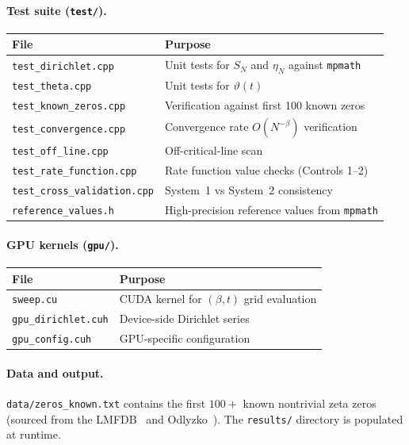 \paragraph{Test suite (\texttt{test/}).}

\begin{longtable}{@{}p{5cm}p{7.7cm}@{}}
\toprule
\textbf{File} & \textbf{Purpose} \\
\midrule
\endhead
\texttt{test\_dirichlet.cpp}        & Unit tests for $S_N$ and $\eta_N$ against \texttt{mpmath} \\
\texttt{test\_theta.cpp}            & Unit tests for $\vartheta(t)$ \\
\texttt{test\_known\_zeros.cpp}     & Verification against first 100 known zeros \\
\texttt{test\_convergence.cpp}      & Convergence rate $O(N^{-\beta})$ verification \\
\texttt{test\_off\_line.cpp}        & Off-critical-line scan \\
\texttt{test\_rate\_function.cpp}   & Rate function value checks (Controls 1--2) \\
\texttt{test\_cross\_validation.cpp}& System~1 vs System~2 consistency \\
\texttt{reference\_values.h}        & High-precision reference values from \texttt{mpmath} \\
\bottomrule
\end{longtable}

\paragraph{GPU kernels (\texttt{gpu/}).}

\begin{longtable}{@{}p{4.2cm}p{8.5cm}@{}}
\toprule
\textbf{File} & \textbf{Purpose} \\
\midrule
\endhead
\texttt{sweep.cu}           & CUDA kernel for $(\beta,t)$ grid evaluation \\
\texttt{gpu\_dirichlet.cuh} & Device-side Dirichlet series \\
\texttt{gpu\_config.cuh}    & GPU-specific configuration \\
\bottomrule
\end{longtable}

\paragraph{Data and output.}
\texttt{data/zeros\_known.txt} contains the first $100+$ known nontrivial zeta zeros
(sourced from the LMFDB~\cite{lmfdb} and Odlyzko~\cite{odlyzko1989}).
The \texttt{results/} directory is populated at runtime.


